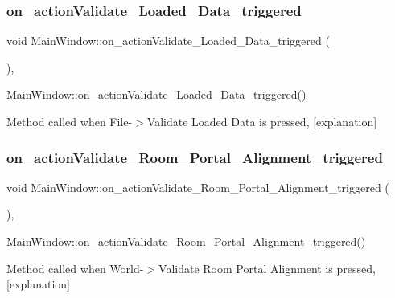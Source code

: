 \subsubsection{\texorpdfstring{on\+\_\+action\+Validate\+\_\+\+Loaded\+\_\+\+Data\+\_\+triggered}{on\_actionValidate\_Loaded\_Data\_triggered}}
{\footnotesize\ttfamily void Main\+Window\+::on\+\_\+action\+Validate\+\_\+\+Loaded\+\_\+\+Data\+\_\+triggered (\begin{DoxyParamCaption}{ }\end{DoxyParamCaption})\hspace{0.3cm}{\ttfamily [private]}, {\ttfamily [slot]}}



\hyperlink{class_main_window_ab1627fe6865e74d1e6364a0183abdf5c}{Main\+Window\+::on\+\_\+action\+Validate\+\_\+\+Loaded\+\_\+\+Data\+\_\+triggered()} 

Method called when File-\/$>$Validate Loaded Data is pressed, \mbox{[}explanation\mbox{]} \mbox{\label{class_main_window_a8d9f011472c3ef05a97ee728f1ed8134}} 
\subsubsection{\texorpdfstring{on\+\_\+action\+Validate\+\_\+\+Room\+\_\+\+Portal\+\_\+\+Alignment\+\_\+triggered}{on\_actionValidate\_Room\_Portal\_Alignment\_triggered}}
{\footnotesize\ttfamily void Main\+Window\+::on\+\_\+action\+Validate\+\_\+\+Room\+\_\+\+Portal\+\_\+\+Alignment\+\_\+triggered (\begin{DoxyParamCaption}{ }\end{DoxyParamCaption})\hspace{0.3cm}{\ttfamily [private]}, {\ttfamily [slot]}}



\hyperlink{class_main_window_a8d9f011472c3ef05a97ee728f1ed8134}{Main\+Window\+::on\+\_\+action\+Validate\+\_\+\+Room\+\_\+\+Portal\+\_\+\+Alignment\+\_\+triggered()} 

Method called when World-\/$>$Validate Room Portal Alignment is pressed, \mbox{[}explanation\mbox{]} \mbox{\label{class_main_window_a18145ab0d7747c6315778992ea38615a}} 
